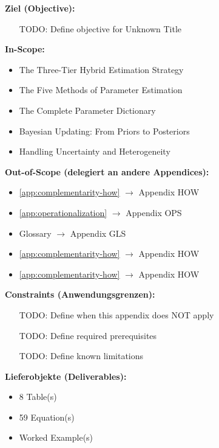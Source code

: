 \documentclass[11pt,a4paper]{article}
\theoremstyle{definition}
\begin{document}
\label{app:bbb-estimation}

\begin{tcolorbox}[
    colback=orange!5!white,
    colframe=orange!75!black,
    title={\textbf{Appendix Scope: Ziel / In-Scope / Out-of-Scope / Constraints}},
    fonttitle=\bfseries
]

\textbf{Ziel (Objective):}
\begin{itemize}[nosep]
    \item [TODO: Define objective for Unknown Title]
\end{itemize}

\textbf{In-Scope:}
\begin{itemize}[nosep]
    \item The Three-Tier Hybrid Estimation Strategy
    \item The Five Methods of Parameter Estimation
    \item The Complete Parameter Dictionary
    \item Bayesian Updating: From Priors to Posteriors
    \item Handling Uncertainty and Heterogeneity
\end{itemize}

\textbf{Out-of-Scope (delegiert an andere Appendices):}
\begin{itemize}[nosep]
    \item \ref{app:complementarity-how} $\rightarrow$ Appendix HOW
    \item \ref{app:operationalization} $\rightarrow$ Appendix OPS
    \item Glossary $\rightarrow$ Appendix GLS
    \item \ref{app:complementarity-how} $\rightarrow$ Appendix HOW
    \item \ref{app:complementarity-how} $\rightarrow$ Appendix HOW
\end{itemize}

\textbf{Constraints (Anwendungsgrenzen):}
\begin{itemize}[nosep]
    \item [TODO: Define when this appendix does NOT apply]
    \item [TODO: Define required prerequisites]
    \item [TODO: Define known limitations]
\end{itemize}

\textbf{Lieferobjekte (Deliverables):}
\begin{itemize}[nosep]
    \item 8 Table(s)
    \item 59 Equation(s)
    \item Worked Example(s)
\end{itemize}

\end{tcolorbox}
\end{document}
